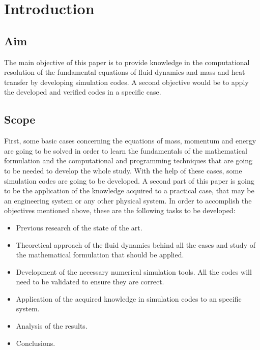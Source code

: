 \chapter{Introduction}
\section{Aim}
The main objective of this paper is to provide knowledge in the computational resolution of the fundamental equations of fluid dynamics and mass and heat transfer by developing simulation codes. A second objective would be to apply the developed and verified codes in a specific case.

\section{Scope}
First, some basic cases concerning the equations of mass, momentum and energy are going to be solved in order to learn the fundamentals of the mathematical formulation and the computational and programming techniques that are going to be needed to develop the whole study. With the help of these cases, some simulation codes are going to be developed.
\newline
\newline
A second part of this paper is going to be the application of the knowledge acquired to a practical case, that may be an engineering system or any other physical system.
\newline
\newline
In order to accomplish the objectives mentioned above, these are the following tasks to be developed:
\begin{itemize}
	\item Previous research of the state of the art.
	\item Theoretical approach of the fluid dynamics behind all the cases and study of the mathematical formulation that should be applied.
	\item Development of the necessary numerical simulation tools. All the codes will need to be validated to ensure they are correct.
	\item Application of the acquired knowledge in simulation codes to an specific system.
	\item Analysis of the results.
	\item Conclusions.
\end{itemize}

